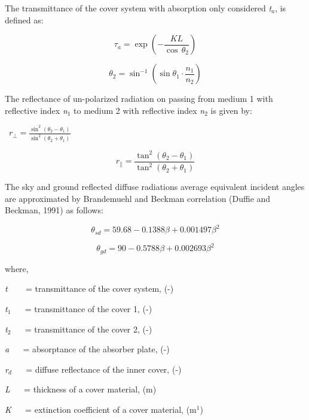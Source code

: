 The transmittance of the cover system with absorption only considered \emph{t}\(_{a}\), is defined as:

\begin{equation}
{\tau_a} = \exp \left( { - \frac{{KL}}{{\cos \,{\theta_2}}}} \right)
\end{equation}

\begin{equation}
{\theta_2} = {\sin ^{ - 1}}\left( {\sin {\theta_1} \cdot \frac{{{n_1}}}{{{n_2}}}} \right)
\end{equation}

The reflectance of un-polarized radiation on passing from medium 1 with reflective index \emph{n}\(_{1}\) to medium 2 with reflective index \emph{n}\(_{2}\) is given by:

~\({r_ \bot } = \frac{{{{\sin }^2}\left( {{\theta_2} - {\theta_1}} \right)}}{{{{\sin }^2}\left( {{\theta_2} + {\theta_1}} \right)}}\)

\begin{equation}
{r_\parallel } = \frac{{{{\tan }^2}\left( {{\theta_2} - {\theta_1}} \right)}}{{{{\tan }^2}\left( {{\theta_2} + {\theta_1}} \right)}}
\end{equation}

The sky and ground reflected diffuse radiations average equivalent incident angles are approximated by Brandemuehl and Beckman correlation (Duffie and Beckman, 1991) as follows:

\begin{equation}
{\theta_{sd}} = 59.68 - 0.1388\beta  + 0.001497{\beta ^2}
\end{equation}

\begin{equation}
{\theta_{gd}} = 90 - 0.5788\beta  + 0.002693{\beta ^2}
\end{equation}

where,

\emph{t} ~~~ = transmittance of the cover system, (-)

\emph{t}\(_{1}\) ~~ = transmittance of the cover 1, (-)

\emph{t}\(_{2}\) ~~ = transmittance of the cover 2, (-)

\emph{a} ~~ = absorptance of the absorber plate, (-)

\emph{r}\(_{d}\) ~~ = diffuse reflectance of the inner cover, (-)

\emph{L} ~~ = thickness of a cover material, (m)

\emph{K} ~~ = extinction coefficient of a cover material, (m\(^{1}\))

